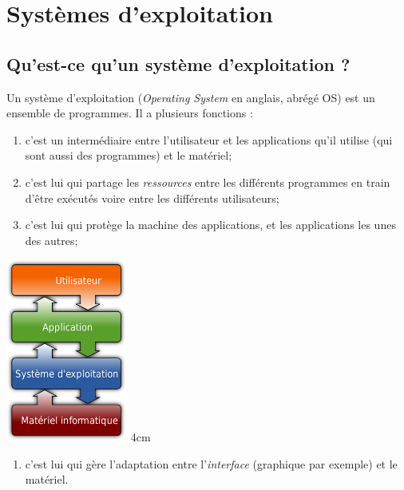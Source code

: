 \documentclass[a4paper,12pt,french]{book}
\begin{document}
	\chapter*{Systèmes d'exploitation}

	\section*{Qu'est-ce qu'un système d'exploitation ?}
	
	\double
	{
		Un système d'exploitation (\textit{Operating System} en anglais, abrégé OS) est un ensemble de programmes. Il a plusieurs fonctions :
		\begin{enumerate}[--]
			\item 	c'est un intermédiaire entre l'utilisateur et les applications qu'il utilise (qui sont aussi des programmes) et le matériel;
			\item 	c'est lui qui partage les \textit{ressources} entre les différents programmes en train d'être exécutés voire entre les différents utilisateurs;
			\item 	c'est lui qui protège la machine des applications, et les applications les unes des autres;
		\end{enumerate}
	}
	{
		\includegraphics[width=4cm]{sysex.png}
	}
	{4cm}
	\begin{enumerate}[--]
		\item 	c'est lui qui gère l'adaptation entre l'\textit{interface} (graphique par exemple) et le matériel.
	\end{enumerate}
		
\end{document}
